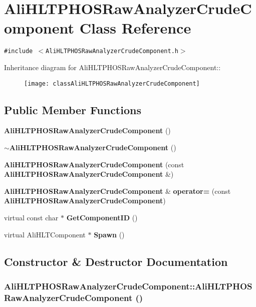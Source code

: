 \section{Ali\-HLTPHOSRaw\-Analyzer\-Crude\-Component Class Reference}
\label{classAliHLTPHOSRawAnalyzerCrudeComponent}
{\tt \#include $<$Ali\-HLTPHOSRaw\-Analyzer\-Crude\-Component.h$>$}

Inheritance diagram for Ali\-HLTPHOSRaw\-Analyzer\-Crude\-Component::\begin{figure}[H]
\begin{center}
\leavevmode
\texttt{[image: classAliHLTPHOSRawAnalyzerCrudeComponent]}
\end{center}
\end{figure}
\subsection*{Public Member Functions}
\begin{CompactItemize}
\item 
{\bf Ali\-HLTPHOSRaw\-Analyzer\-Crude\-Component} ()
\item 
{\bf $\sim$Ali\-HLTPHOSRaw\-Analyzer\-Crude\-Component} ()
\item 
{\bf Ali\-HLTPHOSRaw\-Analyzer\-Crude\-Component} (const {\bf Ali\-HLTPHOSRaw\-Analyzer\-Crude\-Component} \&)
\item 
{\bf Ali\-HLTPHOSRaw\-Analyzer\-Crude\-Component} \& {\bf operator=} (const {\bf Ali\-HLTPHOSRaw\-Analyzer\-Crude\-Component})
\item 
virtual const char $\ast$ {\bf Get\-Component\-ID} ()
\item 
virtual Ali\-HLTComponent $\ast$ {\bf Spawn} ()
\end{CompactItemize}


\subsection{Constructor \& Destructor Documentation}
\subsubsection{\setlength{\rightskip}{0pt plus 5cm}Ali\-HLTPHOSRaw\-Analyzer\-Crude\-Component::Ali\-HLTPHOSRaw\-Analyzer\-Crude\-Component ()}\label{classAliHLTPHOSRawAnalyzerCrudeComponent_a0}


